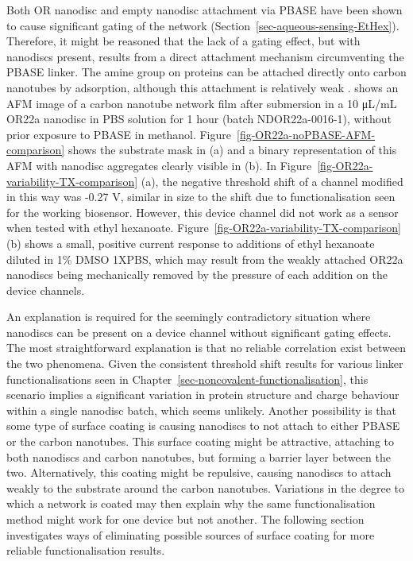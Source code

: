 \documentclass[
  a4paper,
]{scrbook}
\begin{document}
Both OR nanodisc and empty nanodisc attachment via PBASE have been shown
to cause significant gating of the network
(Section~\ref{sec-aqueous-sensing-EtHex}). Therefore, it might be
reasoned that the lack of a gating effect, but with nanodiscs present,
results from a direct attachment mechanism circumventing the PBASE
linker. The amine group on proteins can be attached directly onto carbon
nanotubes by adsorption, although this attachment is relatively weak
\autocite{Bradley2004}. \textcite{OR22a-noPBASE-AFM} shows an AFM image
of a carbon nanotube network film after submersion in a 10 μL/mL OR22a
nanodisc in PBS solution for 1 hour (batch NDOR22a-0016-1), without
prior exposure to PBASE in methanol.
Figure~\ref{fig-OR22a-noPBASE-AFM-comparison} shows the substrate mask
in (a) and a binary representation of this AFM with nanodisc aggregates
clearly visible in (b). In
Figure~\ref{fig-OR22a-variability-TX-comparison} (a), the negative
threshold shift of a channel modified in this way was -0.27 V, similar
in size to the shift due to functionalisation seen for the working
biosensor. However, this device channel did not work as a sensor when
tested with ethyl hexanoate.
Figure~\ref{fig-OR22a-variability-TX-comparison} (b) shows a small,
positive current response to additions of ethyl hexanoate diluted in 1\%
DMSO 1XPBS, which may result from the weakly attached OR22a nanodiscs
being mechanically removed by the pressure of each addition on the
device channels.

An explanation is required for the seemingly contradictory situation
where nanodiscs can be present on a device channel without significant
gating effects. The most straightforward explanation is that no reliable
correlation exist between the two phenomena. Given the consistent
threshold shift results for various linker functionalisations seen in
Chapter~\ref{sec-noncovalent-functionalisation}, this scenario implies a
significant variation in protein structure and charge behaviour within a
single nanodisc batch, which seems unlikely. Another possibility is that
some type of surface coating is causing nanodiscs to not attach to
either PBASE or the carbon nanotubes. This surface coating might be
attractive, attaching to both nanodiscs and carbon nanotubes, but
forming a barrier layer between the two. Alternatively, this coating
might be repulsive, causing nanodiscs to attach weakly to the substrate
around the carbon nanotubes. Variations in the degree to which a network
is coated may then explain why the same functionalisation method might
work for one device but not another. The following section investigates
ways of eliminating possible sources of surface coating for more
reliable functionalisation results.
\end{document}
